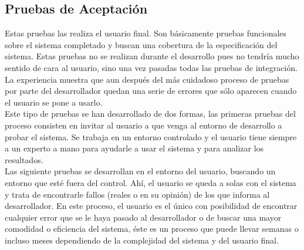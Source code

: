 		\subsection{Pruebas de Aceptación}
		
			Estas pruebas las realiza el usuario final. Son básicamente pruebas funcionales sobre el sistema completado y buscan una cobertura de la especificación del sistema. Estas pruebas no se realizan durante el desarrollo pues no tendría mucho sentido de cara al usuario, sino una vez pasadas todas las pruebas de integración.\\
			
			La experiencia muestra que aun después del más cuidadoso proceso de pruebas por parte del desarrollador quedan una serie de errores que sólo aparecen cuando el usuario se pone a usarlo.\\
			
			Este tipo de pruebas se han desarrollado de dos formas, las primeras pruebas del proceso consisten en invitar al usuario a que venga al entorno de desarrollo a probar el sistema. Se trabaja en un entorno controlado y el usuario tiene siempre a un experto a mano para ayudarle a usar el sistema y para analizar los resultados.\\
			
			Las siguiente pruebas se desarrollan en el entorno del usuario, buscando un entorno que esté fuera del control. Ahí, el usuario se queda a solas con el sistema y trata de encontrarle fallos (reales o en su opinión) de los que informa al desarrollador. En este proceso, el usuario es el único con posibilidad de encontrar cualquier error que se le haya pasado al desarrollador o de buscar una mayor comodidad o eficiencia del sistema, éste es un proceso que puede llevar semanas o incluso meses dependiendo de la complejidad del sistema y del usuario final.
